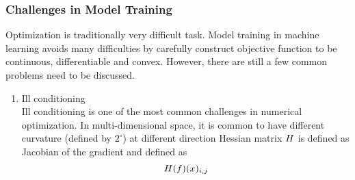 \subsubsection{Challenges in Model Training}

Optimization is traditionally very difficult task. Model training in machine learning avoids many difficulties by carefully construct objective function to be continuous, differentiable and convex. However, there are still a few common problems need to be discussed. 

\begin{enumerate}
    \item Ill conditioning\\
Ill conditioning is one of the most common challenges in numerical optimization. In multi-dimensional space, it is common to have different curvature (defined by $2^\circ$) at different direction
Hessian matrix $\mathnormal{H}$ is defined as Jacobian of the gradient and defined as 
\begin{equation}
    \mathnormal{H}(f)(x)_{i,j}
\end{equation}
\end{enumerate}

